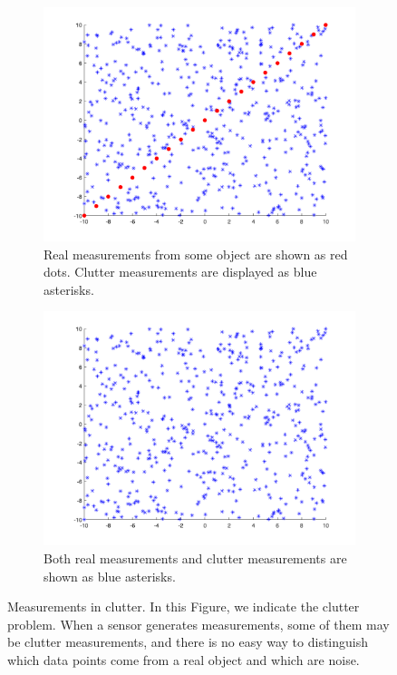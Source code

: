 \begin{figure}
\centering
\begin{subfigure}[t]{.45\textwidth}
  \centering
  \includegraphics[width=.9\linewidth]{figures/clutter.intro.1.png}
   \caption{Real measurements from some object are shown as red dots. Clutter measurements are displayed as blue asterisks.}
  \label{fig:clutter-intro:1}
\end{subfigure}\hfill
\begin{subfigure}[t]{.45\textwidth}
  \centering
  \includegraphics[width=.9\linewidth]{figures/clutter.intro.2.png}
  \caption{Both real measurements and clutter measurements are shown as blue asterisks.}
  \label{fig:clutter-intro:2}
\end{subfigure}
\caption[Measurements in clutter.]{Measurements in clutter. In this Figure, we indicate the clutter problem. When a sensor generates measurements, some of them may be clutter measurements, and there is no easy way to distinguish which data points come from a real object and which are noise.}
\label{fig:clutter-intro}
\end{figure}

